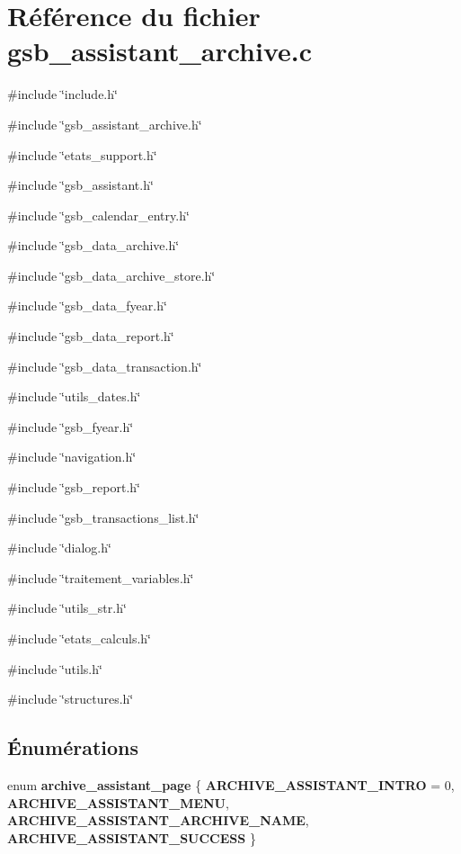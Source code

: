 \section{Référence du fichier gsb\_\-assistant\_\-archive.c}
\label{gsb__assistant__archive_8c}
{\ttfamily \#include \char`\"{}include.h\char`\"{}}\par
{\ttfamily \#include \char`\"{}gsb\_\-assistant\_\-archive.h\char`\"{}}\par
{\ttfamily \#include \char`\"{}etats\_\-support.h\char`\"{}}\par
{\ttfamily \#include \char`\"{}gsb\_\-assistant.h\char`\"{}}\par
{\ttfamily \#include \char`\"{}gsb\_\-calendar\_\-entry.h\char`\"{}}\par
{\ttfamily \#include \char`\"{}gsb\_\-data\_\-archive.h\char`\"{}}\par
{\ttfamily \#include \char`\"{}gsb\_\-data\_\-archive\_\-store.h\char`\"{}}\par
{\ttfamily \#include \char`\"{}gsb\_\-data\_\-fyear.h\char`\"{}}\par
{\ttfamily \#include \char`\"{}gsb\_\-data\_\-report.h\char`\"{}}\par
{\ttfamily \#include \char`\"{}gsb\_\-data\_\-transaction.h\char`\"{}}\par
{\ttfamily \#include \char`\"{}utils\_\-dates.h\char`\"{}}\par
{\ttfamily \#include \char`\"{}gsb\_\-fyear.h\char`\"{}}\par
{\ttfamily \#include \char`\"{}navigation.h\char`\"{}}\par
{\ttfamily \#include \char`\"{}gsb\_\-report.h\char`\"{}}\par
{\ttfamily \#include \char`\"{}gsb\_\-transactions\_\-list.h\char`\"{}}\par
{\ttfamily \#include \char`\"{}dialog.h\char`\"{}}\par
{\ttfamily \#include \char`\"{}traitement\_\-variables.h\char`\"{}}\par
{\ttfamily \#include \char`\"{}utils\_\-str.h\char`\"{}}\par
{\ttfamily \#include \char`\"{}etats\_\-calculs.h\char`\"{}}\par
{\ttfamily \#include \char`\"{}utils.h\char`\"{}}\par
{\ttfamily \#include \char`\"{}structures.h\char`\"{}}\par
\subsection*{Énumérations}
\begin{DoxyCompactItemize}
\item 
enum {\bf archive\_\-assistant\_\-page} \{ {\bf ARCHIVE\_\-ASSISTANT\_\-INTRO} =  0, 
{\bf ARCHIVE\_\-ASSISTANT\_\-MENU}, 
{\bf ARCHIVE\_\-ASSISTANT\_\-ARCHIVE\_\-NAME}, 
{\bf ARCHIVE\_\-ASSISTANT\_\-SUCCESS}
 \}
\end{DoxyCompactItemize}
